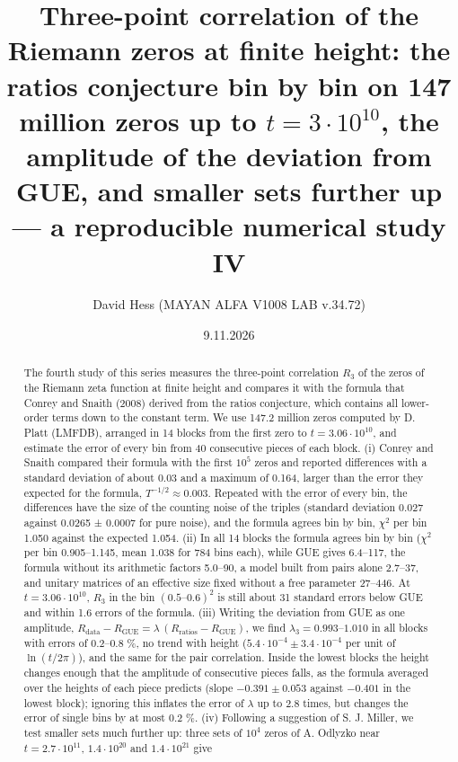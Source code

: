 \documentclass[
  10pt,
]{article}
\title{Three-point correlation of the Riemann zeros at finite height:
the ratios conjecture bin by bin on 147 million zeros up to
\(t = 3\cdot10^{10}\), the amplitude of the deviation from GUE, and
smaller sets further up --- a reproducible numerical study IV}
\author{David Hess (MAYAN ALFA V1008 LAB v.34.72)}
\date{9.11.2026}
\begin{document}
\maketitle
\begin{abstract}
The fourth study of this series measures the three-point correlation
\(R_3\) of the zeros of the Riemann zeta function at finite height and
compares it with the formula that Conrey and Snaith (2008) derived from
the ratios conjecture, which contains all lower-order terms down to the
constant term. We use 147.2 million zeros computed by D. Platt (LMFDB),
arranged in 14 blocks from the first zero to \(t = 3.06\cdot10^{10}\),
and estimate the error of every bin from 40 consecutive pieces of each
block. (i) Conrey and Snaith compared their formula with the first
\(10^5\) zeros and reported differences with a standard deviation of
about 0.03 and a maximum of 0.164, larger than the error they expected
for the formula, \(T^{-1/2} \approx 0.003\). Repeated with the error of
every bin, the differences have the size of the counting noise of the
triples (standard deviation 0.027 against 0.0265 ± 0.0007 for pure
noise), and the formula agrees bin by bin, \(\chi^2\) per bin 1.050
against the expected 1.054. (ii) In all 14 blocks the formula agrees bin
by bin (\(\chi^2\) per bin 0.905--1.145, mean 1.038 for 784 bins each),
while GUE gives 6.4--117, the formula without its arithmetic factors
5.0--90, a model built from pairs alone 2.7--37, and unitary matrices of
an effective size fixed without a free parameter 27--446. At
\(t = 3.06\cdot10^{10}\), \(R_3\) in the bin \((0.5\text{–}0.6)^2\) is
still about 31 standard errors below GUE and within 1.6 errors of the
formula. (iii) Writing the deviation from GUE as one amplitude,
\(R_{\mathrm{data}} - R_{\mathrm{GUE}} = \lambda\,(R_{\mathrm{ratios}} - R_{\mathrm{GUE}})\),
we find \(\lambda_3 = 0.993\)--\(1.010\) in all blocks with errors of
0.2--0.8 \%, no trend with height
(\(5.4\cdot10^{-4} \pm 3.4\cdot10^{-4}\) per unit of \(\ln(t/2\pi)\)),
and the same for the pair correlation. Inside the lowest blocks the
height changes enough that the amplitude of consecutive pieces falls, as
the formula averaged over the heights of each piece predicts (slope
\(-0.391 \pm 0.053\) against \(-0.401\) in the lowest block); ignoring
this inflates the error of \(\lambda\) up to 2.8 times, but changes the
error of single bins by at most 0.2 \%. (iv) Following a suggestion of
S. J. Miller, we test smaller sets much further up: three sets of
\(10^4\) zeros of A. Odlyzko near \(t = 2.7\cdot10^{11}\),
\(1.4\cdot10^{20}\) and \(1.4\cdot10^{21}\) give

\end{abstract}
\end{document}

